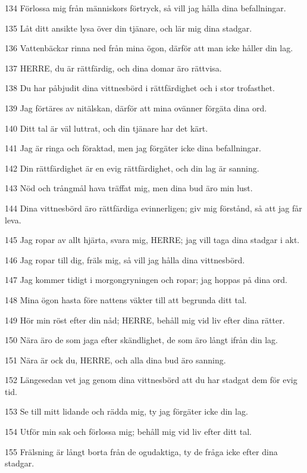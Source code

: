 \par 134 Förlossa mig från människors förtryck, så vill jag hålla dina befallningar.
\par 135 Låt ditt ansikte lysa över din tjänare, och lär mig dina stadgar.
\par 136 Vattenbäckar rinna ned från mina ögon, därför att man icke håller din lag.
\par 137 HERRE, du är rättfärdig, och dina domar äro rättvisa.
\par 138 Du har påbjudit dina vittnesbörd i rättfärdighet och i stor trofasthet.
\par 139 Jag förtäres av nitälskan, därför att mina ovänner förgäta dina ord.
\par 140 Ditt tal är väl luttrat, och din tjänare har det kärt.
\par 141 Jag är ringa och föraktad, men jag förgäter icke dina befallningar.
\par 142 Din rättfärdighet är en evig rättfärdighet, och din lag är sanning.
\par 143 Nöd och trångmål hava träffat mig, men dina bud äro min lust.
\par 144 Dina vittnesbörd äro rättfärdiga evinnerligen; giv mig förstånd, så att jag får leva.
\par 145 Jag ropar av allt hjärta, svara mig, HERRE; jag vill taga dina stadgar i akt.
\par 146 Jag ropar till dig, fräls mig, så vill jag hålla dina vittnesbörd.
\par 147 Jag kommer tidigt i morgongryningen och ropar; jag hoppas på dina ord.
\par 148 Mina ögon hasta före nattens väkter till att begrunda ditt tal.
\par 149 Hör min röst efter din nåd; HERRE, behåll mig vid liv efter dina rätter.
\par 150 Nära äro de som jaga efter skändlighet, de som äro långt ifrån din lag.
\par 151 Nära är ock du, HERRE, och alla dina bud äro sanning.
\par 152 Längesedan vet jag genom dina vittnesbörd att du har stadgat dem för evig tid.
\par 153 Se till mitt lidande och rädda mig, ty jag förgäter icke din lag.
\par 154 Utför min sak och förlossa mig; behåll mig vid liv efter ditt tal.
\par 155 Frälsning är långt borta från de ogudaktiga, ty de fråga icke efter dina stadgar.
